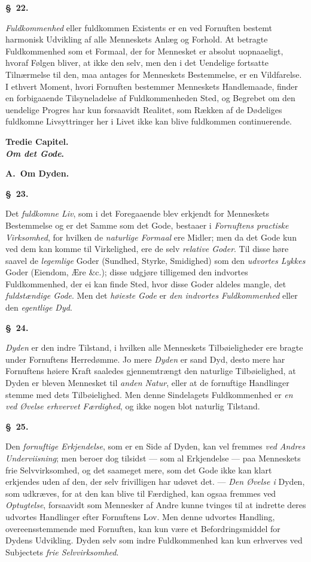 \documentclass[12pt]{article}
\newcommand{\opage}[1]{\marginnote{\footnotesize\textit{[#1]}}}
\newcommand{\slaw}[1]{\par\medskip\begin{center}\textbf{\S~#1.}\end{center}\nopagebreak}
\newcommand{\mchap}[2]{\par\bigskip\begin{center}\large\textbf{#1}\\[0.3em]\textbf{#2}\end{center}\medskip}
\begin{document}
\slaw{22}
\emph{Fuldkommenhed} eller fuldkommen Existents er en ved Fornuften bestemt harmonisk Udvikling af alle Menneskets Anlæg og Forhold. At betragte Fuldkommenhed som et Formaal, der for Mennesket er absolut uopnaaeligt, hvoraf Følgen bliver, at ikke den selv, men den i det Uendelige fortsatte Tilnærmelse til den, maa antages for Menneskets Bestemmelse, er en Vildfarelse. I ethvert Moment, hvori Fornuften bestemmer Menneskets Handlemaade, finder en forbigaaende Tilsyneladelse af Fuldkommenheden Sted, og Begrebet om den uendelige Progres har kun forsaavidt \opage{153}Realitet, som Rækken af de Dødeliges fuldkomne Livsyttringer her i Livet ikke kan blive fuldkommen continuerende.

\mchap{Tredie Capitel.}{\emph{Om det Gode}.}

\begin{center}\textbf{A.\ Om Dyden.}\end{center}

\slaw{23}
Det \emph{fuldkomne Liv}, som i det Foregaaende blev erkjendt for Menneskets Bestemmelse og er det Samme som det Gode, bestaaer i \emph{Fornuftens practiske Virksomhed}, for hvilken de \emph{naturlige Formaal} ere Midler; men da det Gode kun ved dem kan komme til Virkelighed, ere de selv \emph{relative Goder}. Til disse høre saavel de \emph{legemlige} Goder (Sundhed, Styrke, Smidighed) som den \emph{udvortes Lykkes} Goder (Eiendom, Ære \&c.); disse udgjøre tilligemed den indvortes Fuldkommenhed, der ei kan finde Sted, hvor disse Goder aldeles mangle, det \emph{fuldstændige Gode}. Men det \emph{høieste Gode} er \emph{den indvortes Fuldkommenhed} eller den \emph{egentlige Dyd}.

\slaw{24}
\emph{Dyden} er den indre Tilstand, i hvilken alle Menneskets Tilbøieligheder ere bragte under Fornuftens Herredømme. Jo mere \emph{Dyden} er sand Dyd, desto mere har Fornuftens høiere Kraft saaledes gjennemtrængt den naturlige Tilbøielighed, at Dyden er bleven Mennesket til \emph{anden Natur}, eller at de fornuftige Handlinger stemme med dets Tilbøielighed. Men denne Sindelagets Fuldkommenhed er \emph{en ved Øvelse erhvervet Færdighed}, og ikke nogen blot naturlig Tilstand.

\slaw{25}
Den \emph{fornuftige Erkjendelse}, som er en Side af Dyden, kan vel fremmes \emph{ved Andres Underviisning}; men \opage{154}beroer dog tilsidst --- som al Erkjendelse --- paa Menneskets frie Selvvirksomhed, og det saameget mere, som det Gode ikke kan klart erkjendes uden af den, der selv frivilligen har udøvet det. --- \emph{Den Øvelse i} Dyden, som udkræves, for at den kan blive til Færdighed, kan ogsaa fremmes ved \emph{Optugtelse}, forsaavidt som Mennesker af Andre kunne tvinges til at indrette deres udvortes Handlinger efter Fornuftens Lov. Men denne udvortes Handling, overeensstemmende med Fornuften, kan kun være et Befordringsmiddel for Dydens Udvikling. Dyden selv som indre Fuldkommenhed kan kun erhverves ved Subjectets \emph{frie Selvvirksomhed}.
\end{document}
